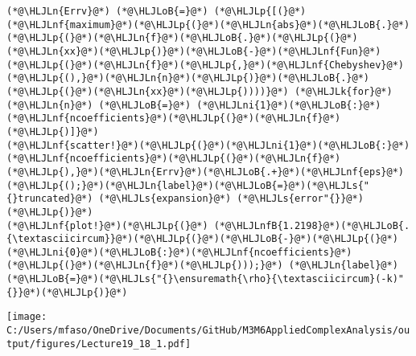 \documentclass[12pt,landscape]{article}
\newcommand{\HLJLk}[1]{\textcolor[RGB]{148,91,176}{\textbf{#1}}}
\newcommand{\HLJLn}[1]{#1}
\newcommand{\HLJLnf}[1]{\textcolor[RGB]{66,102,213}{#1}}
\newcommand{\HLJLs}[1]{\textcolor[RGB]{201,61,57}{#1}}
\newcommand{\HLJLnfB}[1]{\textcolor[RGB]{59,151,46}{#1}}
\newcommand{\HLJLni}[1]{\textcolor[RGB]{59,151,46}{#1}}
\newcommand{\HLJLoB}[1]{\textcolor[RGB]{102,102,102}{\textbf{#1}}}
\newcommand{\HLJLp}[1]{#1}
\begin{document}
{\begin{lstlisting}
(*@\HLJLn{Errv}@*) (*@\HLJLoB{=}@*) (*@\HLJLp{[(}@*)(*@\HLJLnf{maximum}@*)(*@\HLJLp{(}@*)(*@\HLJLn{abs}@*)(*@\HLJLoB{.}@*)(*@\HLJLp{(}@*)(*@\HLJLn{f}@*)(*@\HLJLoB{.}@*)(*@\HLJLp{(}@*)(*@\HLJLn{xx}@*)(*@\HLJLp{)}@*)(*@\HLJLoB{-}@*)(*@\HLJLnf{Fun}@*)(*@\HLJLp{(}@*)(*@\HLJLn{f}@*)(*@\HLJLp{,}@*)(*@\HLJLnf{Chebyshev}@*)(*@\HLJLp{(),}@*)(*@\HLJLn{n}@*)(*@\HLJLp{)}@*)(*@\HLJLoB{.}@*)(*@\HLJLp{(}@*)(*@\HLJLn{xx}@*)(*@\HLJLp{))))}@*) (*@\HLJLk{for}@*) (*@\HLJLn{n}@*) (*@\HLJLoB{=}@*) (*@\HLJLni{1}@*)(*@\HLJLoB{:}@*)(*@\HLJLnf{ncoefficients}@*)(*@\HLJLp{(}@*)(*@\HLJLn{f}@*)(*@\HLJLp{)]}@*)
(*@\HLJLnf{scatter!}@*)(*@\HLJLp{(}@*)(*@\HLJLni{1}@*)(*@\HLJLoB{:}@*)(*@\HLJLnf{ncoefficients}@*)(*@\HLJLp{(}@*)(*@\HLJLn{f}@*)(*@\HLJLp{),}@*)(*@\HLJLn{Errv}@*)(*@\HLJLoB{.+}@*)(*@\HLJLnf{eps}@*)(*@\HLJLp{();}@*)(*@\HLJLn{label}@*)(*@\HLJLoB{=}@*)(*@\HLJLs{"{}truncated}@*) (*@\HLJLs{expansion}@*) (*@\HLJLs{error"{}}@*)(*@\HLJLp{)}@*)
(*@\HLJLnf{plot!}@*)(*@\HLJLp{(}@*) (*@\HLJLnfB{1.2198}@*)(*@\HLJLoB{.{\textasciicircum}}@*)(*@\HLJLp{(}@*)(*@\HLJLoB{-}@*)(*@\HLJLp{(}@*)(*@\HLJLni{0}@*)(*@\HLJLoB{:}@*)(*@\HLJLnf{ncoefficients}@*)(*@\HLJLp{(}@*)(*@\HLJLn{f}@*)(*@\HLJLp{)));}@*) (*@\HLJLn{label}@*)(*@\HLJLoB{=}@*)(*@\HLJLs{"{}\ensuremath{\rho}{\textasciicircum}(-k)"{}}@*)(*@\HLJLp{)}@*)
\end{lstlisting}


\texttt{[image: C:/Users/mfaso/OneDrive/Documents/GitHub/M3M6AppliedComplexAnalysis/output/figures/Lecture19\_18\_1.pdf]}

}
\end{document}
